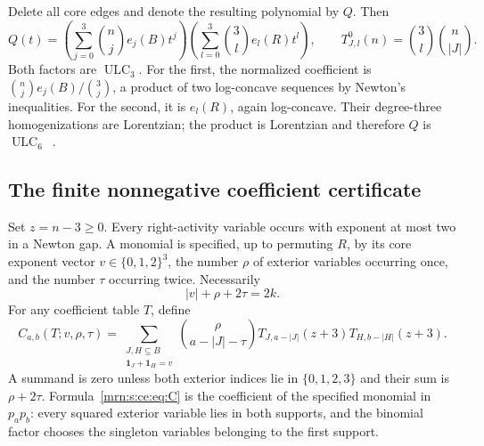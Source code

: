 \documentclass[11pt,a4paper]{article}
\theoremstyle{remark}\newtheorem{remark}[theorem]{Remark}
\newcommand{\ULC}{\operatorname{ULC}}      %
\begin{document}
Delete all core edges and denote the resulting polynomial by $Q$. Then
\begin{equation}\label{mrn:s:ce:eq:Q}
 Q(t)=\left(\sum_{j=0}^3\binom nj e_j(B)t^j\right)
      \left(\sum_{l=0}^3\binom3l e_l(R)t^l\right),
 \qquad T^0_{J,l}(n)=\binom3l\binom n{|J|}.
\end{equation}
Both factors are $\ULC_3$. For the first, the normalized coefficient is
$\binom nj e_j(B)/\binom3j$, a product of two log-concave sequences by Newton's inequalities. For the second, it is $e_l(R)$, again log-concave. Their degree-three homogenizations are Lorentzian; the product is Lorentzian and therefore $Q$ is $\ULC_6$~\cite[Example 2.26 and Corollary 2.32]{b:BH}.

\subsection{The finite nonnegative coefficient certificate}
Set $z=n-3\ge0$. Every right-activity variable occurs with exponent at most two in a Newton gap. A monomial is specified, up to permuting $R$, by its core exponent vector $v\in\{0,1,2\}^3$, the number $\rho$ of exterior variables occurring once, and the number $\tau$ occurring twice. Necessarily
\[
 |v|+\rho+2\tau=2k.
\]
For any coefficient table $T$, define
\begin{equation}\label{mrn:s:ce:eq:C}
 C_{a,b}(T;v,\rho,\tau)=
 \sum_{\substack{J,H\subseteq B\\\mathbf1_J+\mathbf1_H=v}}
 \binom{\rho}{a-|J|-\tau}
 T_{J,a-|J|}(z+3)T_{H,b-|H|}(z+3).
\end{equation}
A summand is zero unless both exterior indices lie in $\{0,1,2,3\}$ and their sum is $\rho+2\tau$. Formula~\eqref{mrn:s:ce:eq:C} is the coefficient of the specified monomial in $p_a p_b$: every squared exterior variable lies in both supports, and the binomial factor chooses the singleton variables belonging to the first support.
\end{document}
